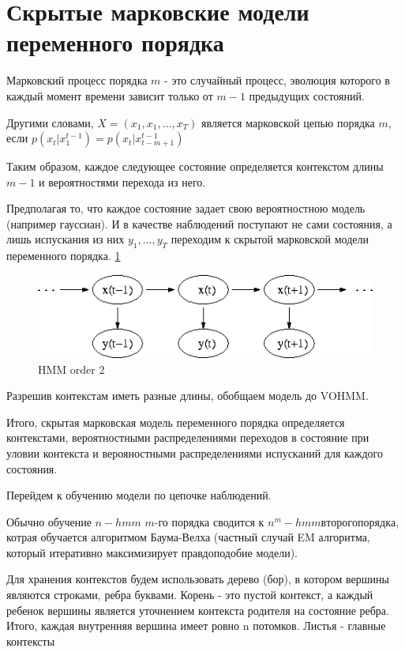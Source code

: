 \documentclass[10pt,a4paper]{article}
\begin{document}
\section{Скрытые марковские модели переменного порядка}

Марковский процесс порядка $ m $ - это случайный процесс, эволюция которого в каждый момент времени зависит только от $ m-1 $ предыдущих состояний.

Другими словами, $ X = (x_{1}, x_{1}, ..., x_{T}) $ является марковской цепью порядка $ m $,
если $ p(x_{t}|x_{1}^{t-1}) = p(x_{t}|x_{t-m+1}^{t-1})$ 

Таким образом, каждое следующее состояние определяется контекстом длины $ m-1 $ и вероятностями перехода из него.

Предполагая то, что каждое состояние задает свою вероятностною модель (например гауссиан). И в качестве наблюдений поступают не сами состояния, а лишь испускания из них $y_{1},...,y_{T}$ переходим к скрытой марковской модели переменного порядка. \ref{ris:image} 
\begin{figure}[hbtp]
\includegraphics[scale=0.4]{Hmm_temporal_bayesian_net.png}
\centering
\caption{HMM order 2}
\label{ris:image}
\end{figure}


Разрешив контекстам иметь разные длины, обобщаем модель до VOHMM. 
 
Итого, скрытая марковская модель переменного порядка определяется контекстами, вероятностными распределениями переходов в состояние при уловии контекста и верояностными распределениями испусканий для каждого состояния.

Перейдем к обучению модели по цепочке наблюдений.

Обычно обучение $ n-hmm$ $ m $-го порядка сводится к $ n^{m}-hmm второго порядка$, котрая обучается алгоритмом Баума-Велха (частный случай EM алгоритма, который итеративно максимизирует правдоподобие модели).

Для хранения контекстов будем использовать дерево (бор), в котором вершины являются строками, ребра буквами. Корень - это пустой контекст, а каждый ребенок вершины является уточнением контекста родителя на состояние ребра. 
Итого, каждая внутренняя вершина имеет ровно n потомков. Листья - главные контексты 
\end{document}
